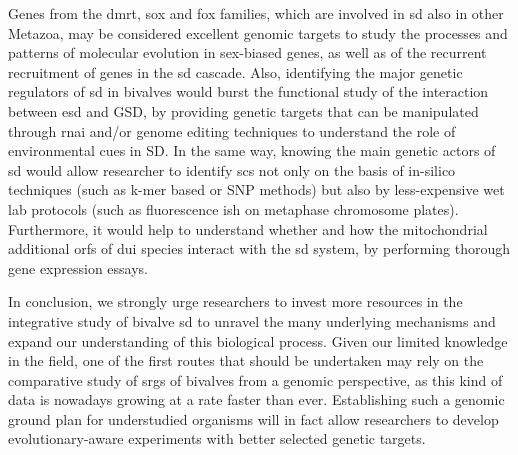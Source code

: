 Genes from the \gls{dmrt}, \gls{sox} and \gls{fox} families, which are involved in \gls{sd} also in other Metazoa, may be considered excellent genomic targets to study the processes and patterns of molecular evolution in sex-biased genes, as well as of the recurrent recruitment of genes in the \gls{sd} cascade. Also, identifying the major genetic regulators of \gls{sd} in bivalves would burst the functional study of the interaction between \gls{esd} and GSD, by providing genetic targets that can be manipulated through \gls{rnai} and/or genome editing techniques to understand the role of environmental cues in SD. In the same way, knowing the main genetic actors of \gls{sd} would allow researcher to identify \glspl{sc} not only on the basis of in-silico techniques (such as k-mer based or SNP methods) but also by less-expensive wet lab protocols (such as fluorescence \gls{ish} on metaphase chromosome plates). Furthermore, it would help to understand whether and how the mitochondrial additional \glspl{orf} of \gls{dui} species interact with the \gls{sd} system, by performing thorough gene expression essays.

In conclusion, we strongly urge researchers to invest more resources in the integrative study of bivalve \gls{sd} to unravel the many underlying mechanisms and expand our understanding of this biological process. Given our limited knowledge in the field, one of the first routes that should be undertaken may rely on the comparative study of \glspl{srg} of bivalves from a genomic perspective, as this kind of data is nowadays growing at a rate faster than ever. Establishing such a genomic ground plan for understudied organisms will in fact allow researchers to develop evolutionary-aware experiments with better selected genetic targets.

